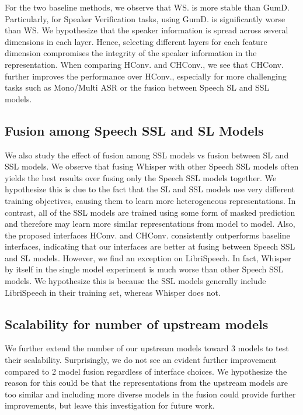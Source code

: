 For the two baseline methods, we observe that WS. is more stable than GumD.
Particularly, for Speaker Verification tasks, using GumD. is significantly worse than WS.
We hypothesize that the speaker information is spread across several dimensions in each layer.
Hence, selecting different layers for each feature dimension 
compromises the integrity of the speaker information in the representation.
When comparing HConv. and CHConv., we see that CHConv. further improves the performance over HConv.,
especially for more challenging tasks such as Mono/Multi ASR or the fusion between Speech SL and SSL models.

\subsection{Fusion among Speech SSL and SL Models}
We also study the effect of fusion among SSL models vs fusion between SL and SSL models. 
We observe that fusing Whisper with other Speech SSL models often yields the best results over fusing only the Speech SSL models together. We hypothesize this is due to the fact that the SL and SSL models use very different training objectives, causing them to learn more heterogeneous representations. In contrast, all of the SSL models are trained using some form of masked prediction and therefore may learn more similar representations from model to model.
Also, the proposed interfaces HConv. and CHConv. consistently outperforms baseline interfaces, indicating that our interfaces are better at fusing between Speech SSL and SL models.
However, we find an exception on LibriSpeech.
In fact, Whisper by itself in the single model experiment is much worse than other Speech SSL models.
We hypothesize this is because the SSL models generally include LibriSpeech in their training set, whereas Whisper does not.


\subsection{Scalability for number of upstream models}
We further extend the number of our upstream models toward 3 models to test their scalability.
Surprisingly, we do not see an evident further improvement compared to 2 model fusion regardless of interface choices.
We hypothesize the reason for this could be that the representations from the upstream models are too similar and including more diverse models in the fusion could provide further improvements, but leave this investigation for future work.

